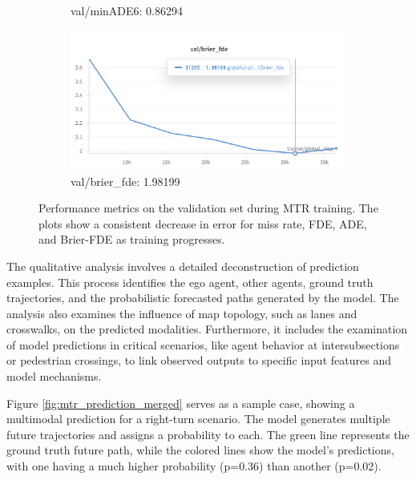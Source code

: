 \begin{figure}[htbp]
\begin{subfigure}[b]{0.48\textwidth}
        \caption{val/minADE6: 0.86294}
    \end{subfigure}
    \hfill
    \begin{subfigure}[b]{0.48\textwidth}
        \centering
        \includegraphics[clip, width=\textwidth]{figures/val_brier_fde.png}
        \caption{val/brier\_fde: 1.98199}
    \end{subfigure}
    \caption{Performance metrics on the validation set during MTR training. The plots show a consistent decrease in error for miss rate, FDE, ADE, and Brier-FDE as training progresses. }
    \label{fig:validation_metrics_merged}
\end{figure}

\label{sec:results_qualitative_merged}
The qualitative analysis involves a detailed deconstruction of prediction examples. This process identifies the ego agent, other agents, ground truth trajectories, and the probabilistic forecasted paths generated by the model. The analysis also examines the influence of map topology, such as lanes and crosswalks, on the predicted modalities. Furthermore, it includes the examination of model predictions in critical scenarios, like agent behavior at intersubsections or pedestrian crossings, to link observed outputs to specific input features and model mechanisms.

Figure \ref{fig:mtr_prediction_merged} serves as a sample case, showing a multimodal prediction for a right-turn scenario. The model generates multiple future trajectories and assigns a probability to each. The green line represents the ground truth future path, while the colored lines show the model's predictions, with one having a much higher probability (p=0.36) than another (p=0.02).

